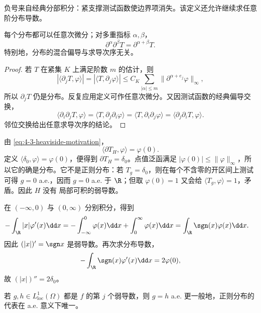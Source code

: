 负号来自经典分部积分：紧支撑测试函数使边界项消失。该定义还允许继续求任意阶分布导数。

\begin{proposition}[分布导数永远存在]\label{proposition:4-3-2-1}
每个分布都可以任意次微分；对多重指标 $\alpha,\beta$，
\[
 \partial^\alpha\partial^\beta T=\partial^{\alpha+\beta}T.
\]
特别地，分布的混合偏导与求导次序无关。
\end{proposition}

\begin{proof}
若 $T$ 在紧集 $K$ 上满足阶数 $m$ 的估计，则
\[
 |\langle\partial_jT,\varphi\rangle|
 =|\langle T,\partial_j\varphi\rangle|
 \leq C_K\sum_{|\alpha|\leq m}\|\partial^{\alpha+e_j}\varphi\|_\infty,
\]
所以 $\partial_jT$ 仍是分布。反复应用定义可作任意次微分。又因测试函数的经典偏导交换，
\[
 \langle\partial_i\partial_jT,\varphi\rangle
 =\langle T,\partial_j\partial_i\varphi\rangle
 =\langle T,\partial_i\partial_j\varphi\rangle
 =\langle\partial_j\partial_iT,\varphi\rangle.
\]
邻位交换给出任意求导次序的结论。
\end{proof}

\begin{example}[Heaviside 函数]\label{ex:4-3-2-1}
由 \eqref{eq:4-3-heaviside-motivation}，
\[
 \langle\partial T_H,\varphi\rangle=\varphi(0).
\]
定义 $\langle\delta_0,\varphi\rangle=\varphi(0)$，便得到
$\partial T_H=\delta_0$。点值泛函满足
$|\varphi(0)|\leq\|\varphi\|_\infty$，所以它的确是分布。它不是正则分布：若
$T_g=\delta_0$，则在每个不含零的开区间上测试可得 $g=0$ a.e.，因而 $g=0$ a.e. 于
$\R$；但取 $\varphi(0)=1$ 又会给 $\langle T_g,\varphi\rangle=1$，矛盾。因此 $H$ 没有
局部可积的弱导数。
\end{example}

\begin{example}[绝对值]\label{ex:4-3-2-2}
在 $(-\infty,0)$ 与 $(0,\infty)$ 分别积分，得到
\begin{align*}
 -\int_\R|x|\varphi'(x)\dd x
 &=-\int_{-\infty}^0\varphi(x)\dd x+
   \int_0^\infty\varphi(x)\dd x
 =\int_\R \sgn(x)\varphi(x)\dd x.
\end{align*}
因此 $(|x|)'=\sgn x$ 是弱导数。再次求分布导数，
\[
 -\int_\R\sgn(x)\varphi'(x)\dd x=2\varphi(0),
\]
故 $(|x|)''=2\delta_0$。
\end{example}

\begin{theorem}[弱导数唯一性]\label{theorem:4-3-2-2}
若 $g,h\in L^1_{\mathrm{loc}}(\Omega)$ 都是 $f$ 的第 $j$ 个弱导数，则 $g=h$ a.e.
更一般地，正则分布的代表在 a.e. 意义下唯一。
\end{theorem}

